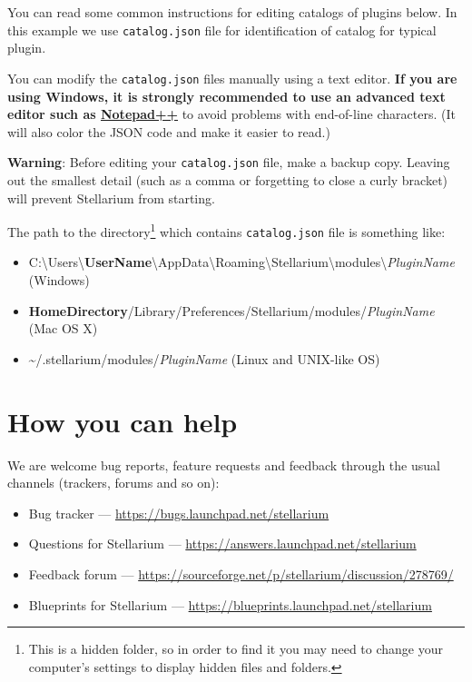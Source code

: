 You can read some common instructions for editing catalogs of plugins
below. In this example we use \texttt{catalog.json} file for
identification of catalog for typical plugin.

You can modify the \texttt{catalog.json} files manually using a text
editor. \textbf{If you are using Windows, it is strongly recommended to
use an advanced text editor such as
\href{http://notepad-plus-plus.org/}{Notepad++}} to avoid problems with
end-of-line characters. (It will also color the JSON code and make it
easier to read.)

\textbf{Warning}: Before editing your \texttt{catalog.json} file, make a
backup copy. Leaving out the smallest detail (such as a comma or
forgetting to close a curly bracket) will prevent Stellarium from
starting.

The path to the directory\footnote{This is a hidden folder, so in order to find it you may need to change your computer's settings to display hidden files and folders.} which contains \texttt{catalog.json} file is
something like:

\begin{itemize}
\item
  C:\textbackslash Users\textbackslash\textbf{UserName}\textbackslash AppData\textbackslash Roaming\textbackslash Stellarium\textbackslash modules\textbackslash \textit{PluginName}\\ (Windows)
\item
  \textbf{HomeDirectory}/Library/Preferences/Stellarium/modules/\textit{PluginName}\\ (Mac OS X)
\item
  \textasciitilde{}/.stellarium/modules/\textit{PluginName} (Linux and UNIX-like OS)
\end{itemize}

\section{How you can help}\label{how-you-can-help}

We are welcome bug reports, feature requests and feedback through the
usual channels (trackers, forums and so on):
\begin{itemize}
\item Bug tracker --- \url{https://bugs.launchpad.net/stellarium}
\item Questions for Stellarium --- \url{https://answers.launchpad.net/stellarium}
\item Feedback forum --- \url{https://sourceforge.net/p/stellarium/discussion/278769/}
\item Blueprints for Stellarium --- \url{https://blueprints.launchpad.net/stellarium}
\end{itemize}


